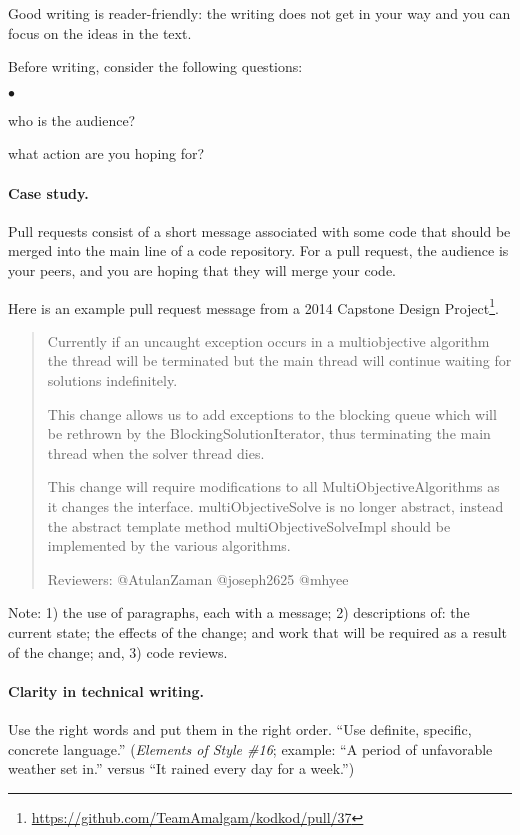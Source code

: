 \documentclass[11pt]{article}
\newcommand{\squishlist}{
 \begin{list}{$\bullet$}
  { \setlength{\itemsep}{0pt}
     \setlength{\parsep}{3pt}
     \setlength{\topsep}{3pt}
     \setlength{\partopsep}{0pt}
     \setlength{\leftmargin}{1.5em}
     \setlength{\labelwidth}{1em}
     \setlength{\labelsep}{0.5em} } }
\newcommand{\squishend}{
  \end{list}  }
\begin{document}
Good writing is reader-friendly: the writing does not get in your way and you can focus
on the ideas in the text.

Before writing, consider the following questions:
\squishlist
\item who is the audience?
\item what action are you hoping for?
\squishend

\paragraph{Case study.} Pull requests consist of a short message associated with some code that should be merged into the main line of a code repository.
For a pull request, the audience is your peers, and you are hoping that they will merge your code.

Here is an example pull request message from a 2014 Capstone Design Project\footnote{\url{https://github.com/TeamAmalgam/kodkod/pull/37}}. 

\begin{quote}
Currently if an uncaught exception occurs in a multiobjective algorithm the thread will be terminated but the main thread will continue waiting for solutions indefinitely.

This change allows us to add exceptions to the blocking queue which will be rethrown by the BlockingSolutionIterator, thus terminating the main thread when the solver thread dies.

This change will require modifications to all MultiObjectiveAlgorithms as it changes the interface.
multiObjectiveSolve is no longer abstract, instead the abstract template method multiObjectiveSolveImpl should be implemented by the various algorithms.

Reviewers: @AtulanZaman @joseph2625 @mhyee
\end{quote}
Note: 1) the use of paragraphs, each with a message; 2) descriptions of: the current state; the effects of the change; and work that will be required as a result of the change; and, 3) code reviews.

\paragraph{Clarity in technical writing.} Use the right words and put them in the right order. ``Use definite, specific, concrete language.'' (\emph{Elements of Style \#16}; example: ``A period of unfavorable weather set in.'' versus ``It rained every day for a week.'')
\end{document}
